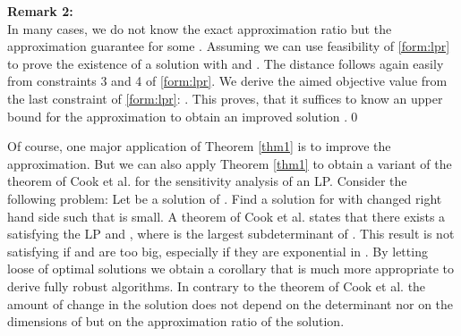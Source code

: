 \documentclass[a4paper,11pt]{article}
\begin{document}
{\bf Remark 2:\\}
In many cases, we do not know the exact approximation ratio  but the 
approximation
guarantee  for some .
Assuming  we can use feasibility of \ref{form:lpr} to prove the existence of
a solution  with  and .
The distance  follows again easily from constraints 3 and 4 of \ref{form:lpr}.
We derive the aimed objective value  from the last constraint of \ref{form:lpr}:
.
This proves, that it suffices to know an upper bound for the approximation to obtain an improved solution .\qed


Of course, one major application of Theorem \ref{thm1} is to improve the approximation. 
But we can also apply Theorem \ref{thm1} to obtain a variant of the theorem of
Cook et al. \cite{cook1986sensitivity} for the sensitivity analysis of
an LP. Consider the following problem: Let  be a solution of .  Find a solution  for  with changed right hand side such that
 is small. A theorem of Cook
et al. \cite{cook1986sensitivity} states that there exists a 
satisfying the LP and , where  is the largest subdeterminant of
. This result is not satisfying if  and  are too big,
especially if they are exponential in . By letting loose of optimal solutions we obtain
a corollary that is much more appropriate to derive fully robust algorithms.
In contrary to the theorem of Cook et al. \cite{cook1986sensitivity} the amount of change in the solution does not depend on the determinant 
nor on the dimensions
of  but on the approximation ratio of the solution.
\end{document}
